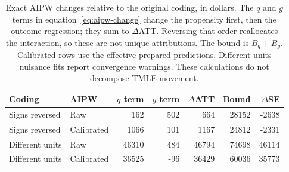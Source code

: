 \begin{table}[ht]
\centering
\small
\caption{Exact AIPW changes relative to the original coding, in dollars.
The $q$ and $g$ terms in equation~\eqref{eq:aipw-change} change the
propensity first, then the outcome regression; they sum to $\Delta$ATT.
Reversing that order reallocates the interaction, so these are not unique
attributions. The bound is $B_q+B_g$. Calibrated rows use the effective
prepared predictions. Different-units nuisance fits report convergence
warnings. These calculations do not decompose TMLE movement.}
\label{tab:causal-contrast}

\begin{tabular}{llrrrrr}
\toprule
Coding & AIPW & $q$ term & $g$ term & $\Delta$ATT & Bound & $\Delta$SE\\
\midrule
Signs reversed & Raw & 162 & 502 & 664 & 28152 & -2638\\
Signs reversed & Calibrated & 1066 & 101 & 1167 & 24812 & -2331\\
Different units & Raw & 46310 & 484 & 46794 & 74698 & 46114\\
Different units & Calibrated & 36525 & -96 & 36429 & 60036 & 35773\\
\bottomrule
\end{tabular}
\end{table}
